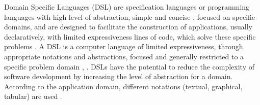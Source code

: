 
Domain Specific Languages (DSL) are specification languages or programming languages with high level of abstraction, simple and concise \cite{raja2010}, focused on specific domains, and are designed to facilitate the construction of applications, usually declaratively, with limited expressiveness lines of code, which solve these specific problems \cite{neeraj2017}. A DSL is a computer language of limited expressiveness, through appropriate notations and abstractions, focused and generally restricted to a specific problem domain \cite{fowler2013}, \cite{vanDeursen2000}. DSLs have the potential to reduce the complexity of software development by increasing the level of abstraction for a domain. According to the application domain, different notations (textual, graphical, tabular) are used \cite{pfeiffer2008}.




